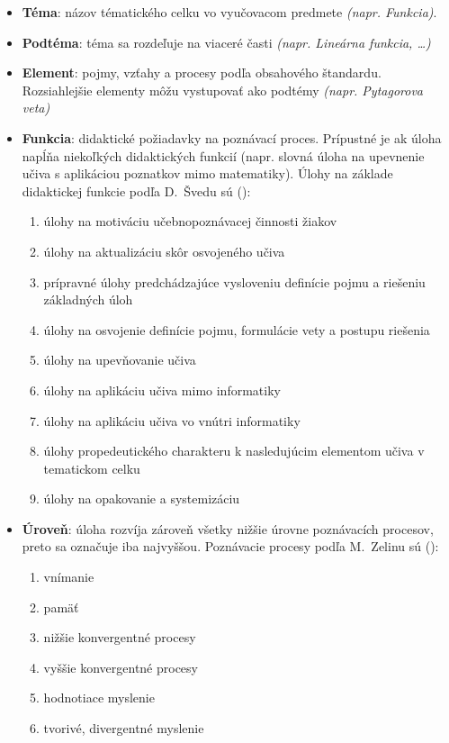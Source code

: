 \begin{itemize}[noitemsep]
\item \textbf{Téma}: názov tématického celku vo vyučovacom predmete \emph{(napr. Funkcia)}.
\item \textbf{Podtéma}: téma sa rozdeľuje na viaceré časti \emph{(napr. Lineárna funkcia, \dots)}
\item \textbf{Element}: pojmy, vzťahy a procesy podľa obsahového štandardu. Rozsiahlejšie elementy môžu vystupovať ako podtémy \emph{(napr. Pytagorova veta)}
\item \textbf{Funkcia}: didaktické požiadavky na poznávací proces. Prípustné je ak úloha napĺňa niekoľkých didaktických funkcií (napr. slovná úloha na upevnenie učiva s aplikáciou poznatkov mimo matematiky). Úlohy na základe didaktickej funkcie podľa D.~Švedu sú (\cite{sveda_ulohy_1992}):
\begin{enumerate}[label=\alph*),noitemsep,topsep=0pt]
\item úlohy na motiváciu učebnopoznávacej činnosti žiakov
\item úlohy na aktualizáciu skôr osvojeného učiva
\item prípravné úlohy predchádzajúce vysloveniu definície pojmu a riešeniu základných úloh 
\item úlohy na osvojenie definície pojmu, formulácie vety a postupu riešenia
\item úlohy na upevňovanie učiva
\item úlohy na aplikáciu učiva mimo informatiky
\item úlohy na aplikáciu učiva vo vnútri informatiky
\item úlohy propedeutického charakteru k nasledujúcim elementom učiva v tematickom celku
\item úlohy na opakovanie a systemizáciu
\end{enumerate}

\item \textbf{Úroveň}: úloha rozvíja zároveň všetky nižšie úrovne poznávacích procesov, preto sa označuje iba najvyššou. Poznávacie procesy podľa M.~Zelinu sú (\cite{zelina_tvorivost_1990}):
\begin{enumerate}[label=\alph*),noitemsep,topsep=0pt]
\item vnímanie
\item pamäť
\item nižšie konvergentné procesy
\item vyššie konvergentné procesy
\item hodnotiace myslenie
\item tvorivé, divergentné myslenie
\end{enumerate}
\end{itemize}

